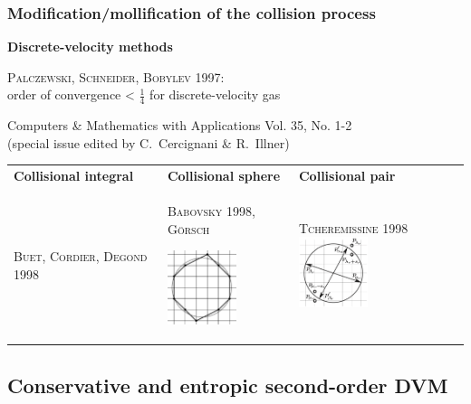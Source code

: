 \documentclass[mathserif]{beamer} %
\newcommand{\Cite}[2][]{\alert{\textsc{#2 #1}}}
\begin{document}
\begin{frame}
    \frametitle{Modification/mollification of the collision process}
    \centering
    {\Large\bf Discrete-velocity methods}\vspace{10pt}

    \Cite[1997]{Palczewski, Schneider, Bobylev}:\\ %
        order of convergence < \(\frac14\) for discrete-velocity gas
    \vspace{10pt}
    \setlength{\leftmarginii}{10pt}
    \setlength{\leftmarginiii}{\leftmarginii}
    \begin{adjustwidth}{-2.5em}{-2.5em}
    \centering
    Computers \& Mathematics with Applications Vol. 35, No. 1-2\\
    (special issue edited by C.~Cercignani \& R.~Illner) %

    \newcommand{\ColW}{}
    \begin{tabular}{>{\centering\arraybackslash}p{\ColW}>{\centering\arraybackslash}p{\ColW}>{\centering\arraybackslash}p{\ColW}}
		\centering\bfseries Collisional integral &
		\centering\bfseries Collisional sphere &
		{\centering\bfseries Collisional pair} \\
		\Cite[1998]{Buet, Cordier, Degond} &
		\Cite[1998]{Babovsky}, \Cite{G\"orsch}

		\vspace{-10pt}
		\includegraphics[width=2cm]{schemes/sphere} &
		\Cite[1998]{Tcheremissine}\vspace{5pt}
		\includegraphics[width=2cm]{schemes/pair}
	\end{tabular}
    \end{adjustwidth}
\end{frame}

\subsection[(Tcheremissine's method)]
{Conservative and entropic second-order DVM}
\end{document}
